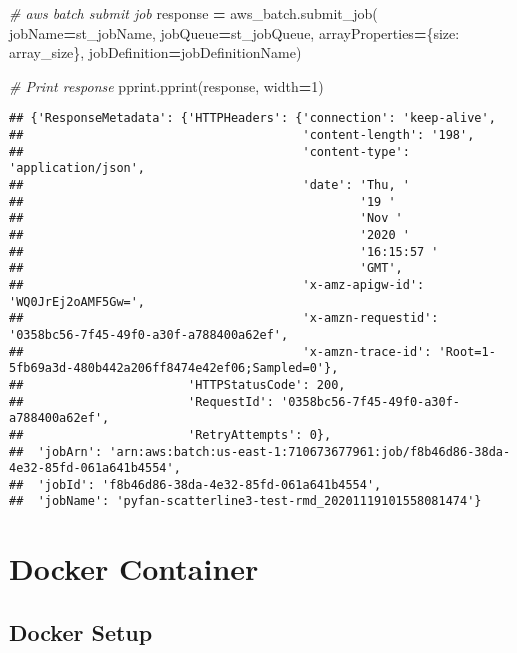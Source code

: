 \documentclass[
]{book}
\newenvironment{Shaded}{\begin{snugshade}}{\end{snugshade}}
\newcommand{\CommentTok}[1]{\textcolor[rgb]{0.56,0.35,0.01}{\textit{#1}}}
\newcommand{\DecValTok}[1]{\textcolor[rgb]{0.00,0.00,0.81}{#1}}
\newcommand{\NormalTok}[1]{#1}
\newcommand{\OperatorTok}[1]{\textcolor[rgb]{0.81,0.36,0.00}{\textbf{#1}}}
\newcommand{\StringTok}[1]{\textcolor[rgb]{0.31,0.60,0.02}{#1}}
\begin{document}
\begin{Shaded}
\begin{Highlighting}[]
\CommentTok{\# aws batch submit job}
\NormalTok{response }\OperatorTok{=}\NormalTok{ aws\_batch.submit\_job(}
\NormalTok{    jobName}\OperatorTok{=}\NormalTok{st\_jobName,}
\NormalTok{    jobQueue}\OperatorTok{=}\NormalTok{st\_jobQueue,}
\NormalTok{    arrayProperties}\OperatorTok{=}\NormalTok{\{}\StringTok{\textquotesingle{}size\textquotesingle{}}\NormalTok{: array\_size\},}
\NormalTok{    jobDefinition}\OperatorTok{=}\NormalTok{jobDefinitionName)}
    
\CommentTok{\# Print response}
\NormalTok{pprint.pprint(response, width}\OperatorTok{=}\DecValTok{1}\NormalTok{)}
\end{Highlighting}
\end{Shaded}

\begin{verbatim}
## {'ResponseMetadata': {'HTTPHeaders': {'connection': 'keep-alive',
##                                       'content-length': '198',
##                                       'content-type': 'application/json',
##                                       'date': 'Thu, '
##                                               '19 '
##                                               'Nov '
##                                               '2020 '
##                                               '16:15:57 '
##                                               'GMT',
##                                       'x-amz-apigw-id': 'WQ0JrEj2oAMF5Gw=',
##                                       'x-amzn-requestid': '0358bc56-7f45-49f0-a30f-a788400a62ef',
##                                       'x-amzn-trace-id': 'Root=1-5fb69a3d-480b442a206ff8474e42ef06;Sampled=0'},
##                       'HTTPStatusCode': 200,
##                       'RequestId': '0358bc56-7f45-49f0-a30f-a788400a62ef',
##                       'RetryAttempts': 0},
##  'jobArn': 'arn:aws:batch:us-east-1:710673677961:job/f8b46d86-38da-4e32-85fd-061a641b4554',
##  'jobId': 'f8b46d86-38da-4e32-85fd-061a641b4554',
##  'jobName': 'pyfan-scatterline3-test-rmd_20201119101558081474'}
\end{verbatim}

\hypertarget{docker-container}{%
\chapter{Docker Container}\label{docker-container}}

\hypertarget{docker-setup}{%
\section{Docker Setup}\label{docker-setup}}
\end{document}

